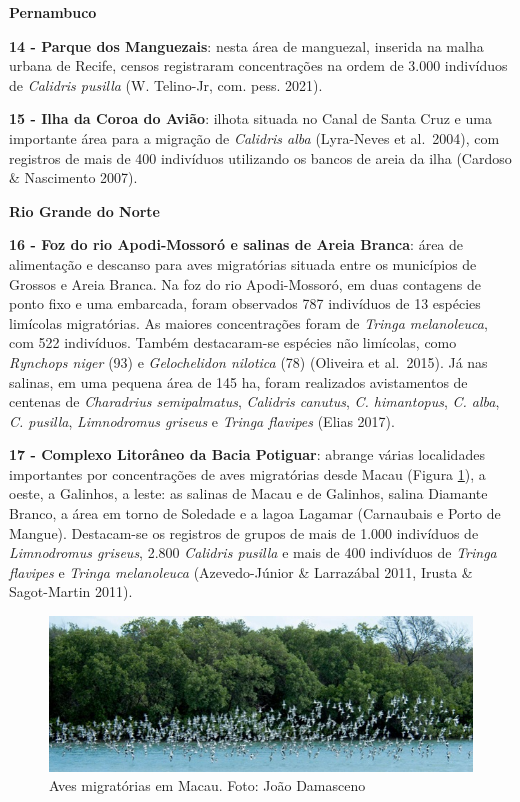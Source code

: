 \documentclass[
  oneside]{scrbook}
\begin{document}
\textbf{Pernambuco}

\textbf{14 - Parque dos Manguezais}: nesta área de manguezal, inserida na malha urbana de Recife, censos registraram concentrações na ordem de 3.000 indivíduos de \emph{Calidris pusilla} (W. Telino-Jr, com. pess. 2021).

\textbf{15 - Ilha da Coroa do Avião}: ilhota situada no Canal de Santa Cruz e uma importante área para a migração de \emph{Calidris alba} (Lyra-Neves et al.~2004), com registros de mais de 400 indivíduos utilizando os bancos de areia da ilha (Cardoso \& Nascimento 2007).

\textbf{Rio Grande do Norte}

\textbf{16 - Foz do rio Apodi-Mossoró e salinas de Areia Branca}: área de alimentação e descanso para aves migratórias situada entre os municípios de Grossos e Areia Branca. Na foz do rio Apodi-Mossoró, em duas contagens de ponto fixo e uma embarcada, foram observados 787 indivíduos de 13 espécies limícolas migratórias. As maiores concentrações foram de \emph{Tringa melanoleuca}, com 522 indivíduos. Também destacaram-se espécies não limícolas, como \emph{Rynchops niger} (93) e \emph{Gelochelidon nilotica} (78) (Oliveira et al.~2015). Já nas salinas, em uma pequena área de 145 ha, foram realizados avistamentos de centenas de \emph{Charadrius semipalmatus}, \emph{Calidris canutus}, \emph{C. himantopus}, \emph{C. alba}, \emph{C. pusilla}, \emph{Limnodromus griseus} e \emph{Tringa flavipes} (Elias 2017).

\textbf{17 - Complexo Litorâneo da Bacia Potiguar}: abrange várias localidades importantes por concentrações de aves migratórias desde Macau (Figura \ref{fig:23}), a oeste, a Galinhos, a leste: as salinas de Macau e de Galinhos, salina Diamante Branco, a área em torno de Soledade e a lagoa Lagamar (Carnaubais e Porto de Mangue). Destacam-se os registros de grupos de mais de 1.000 indivíduos de \emph{Limnodromus griseus}, 2.800 \emph{Calidris pusilla} e mais de 400 indivíduos de \emph{Tringa flavipes} e \emph{Tringa melanoleuca} (Azevedo-Júnior \& Larrazábal 2011, Irusta \& Sagot-Martin 2011).

\begin{figure}[H]

{\centering \includegraphics[width=0.75\linewidth]{imagens/cap07/Figura_7.3} 

}

\caption{Aves migratórias em Macau. Foto: João Damasceno}\label{fig:23}
\end{figure}
\end{document}
